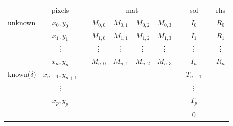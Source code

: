 \documentclass[hidelinks, english]{report}
\begin{document}
\begin{table*}[t]
    \centering
    \begin{tabular}{lclcccccccc}
        & pixels & & \multicolumn{4}{c}{mat}                                                                                                           & \multicolumn{1}{l}{}  & sol & \multicolumn{1}{l}{}  & rhs                        \\ \cline{2-2} \cline{4-7} \cline{9-9} \cline{11-11}
        \multicolumn{1}{l|}{\multirow{4}{*}{unknown}}         & \multicolumn{1}{c|}{$x_0,y_0$}         & \multicolumn{1}{l|}{} & \multicolumn{1}{c|}{$M_{0,0}$} & \multicolumn{1}{c|}{$M_{0,1}$} & \multicolumn{1}{c|}{$M_{0,2}$} & \multicolumn{1}{c|}{$M_{0,3}$} & \multicolumn{1}{c|}{} & \multicolumn{1}{c|}{$I_0$}     & \multicolumn{1}{c|}{} & \multicolumn{1}{c|}{$R_0$} \\ \cline{2-2} \cline{4-7} \cline{9-9} \cline{11-11}
        \multicolumn{1}{l|}{}                                 & \multicolumn{1}{c|}{$x_1,y_1$}         & \multicolumn{1}{l|}{} & \multicolumn{1}{c|}{$M_{1,0}$} & \multicolumn{1}{c|}{$M_{1,1}$} & \multicolumn{1}{c|}{$M_{1,2}$} & \multicolumn{1}{c|}{$M_{1,3}$} & \multicolumn{1}{c|}{} & \multicolumn{1}{c|}{$I_1$}     & \multicolumn{1}{c|}{} & \multicolumn{1}{c|}{$R_1$} \\ \cline{2-2} \cline{4-7} \cline{9-9} \cline{11-11}
        \multicolumn{1}{l|}{}                                 & \multicolumn{1}{c|}{\vdots}            & \multicolumn{1}{l|}{} & \multicolumn{1}{c|}{\vdots}    & \multicolumn{1}{c|}{\vdots}     & \multicolumn{1}{c|}{\vdots}  & \multicolumn{1}{c|}{\vdots}    & \multicolumn{1}{c|}{} & \multicolumn{1}{c|}{\vdots}    & \multicolumn{1}{c|}{} & \multicolumn{1}{c|}{\vdots}\\ \cline{2-2} \cline{4-7} \cline{9-9} \cline{11-11}
        \multicolumn{1}{l|}{}                                 & \multicolumn{1}{c|}{$x_n,y_n$}         & \multicolumn{1}{l|}{} & \multicolumn{1}{c|}{$M_{n,0}$} & \multicolumn{1}{c|}{$M_{n,1}$} & \multicolumn{1}{c|}{$M_{n,2}$} & \multicolumn{1}{c|}{$M_{n,3}$} & \multicolumn{1}{c|}{} & \multicolumn{1}{c|}{$I_n$}     & \multicolumn{1}{c|}{} & \multicolumn{1}{c|}{$R_n$} \\ \cline{2-2} \cline{4-7} \cline{9-9} \cline{11-11}
        \multicolumn{1}{l|}{\multirow{3}{*}{known($\delta$)}} & \multicolumn{1}{c|}{$x_{n+1},y_{n+1}$} & & & & & & \multicolumn{1}{c|}{} & \multicolumn{1}{c|}{$T_{n+1}$} & &                            \\ \cline{2-2} \cline{9-9}
        \multicolumn{1}{l|}{}                                 & \multicolumn{1}{c|}{\vdots}            & & & & & & \multicolumn{1}{c|}{} & \multicolumn{1}{c|}{\vdots}    & &                            \\ \cline{2-2} \cline{9-9}
        \multicolumn{1}{l|}{}                                 & \multicolumn{1}{c|}{$x_p,y_p$}         & & & & & & \multicolumn{1}{c|}{} & \multicolumn{1}{c|}{$T_p$}     & &                            \\ \cline{2-2} \cline{9-9}
        & & & & & & & \multicolumn{1}{c|}{} & \multicolumn{1}{c|}{0}         & &                            \\ \cline{9-9}
    \end{tabular}


\end{table*}
\end{document}
